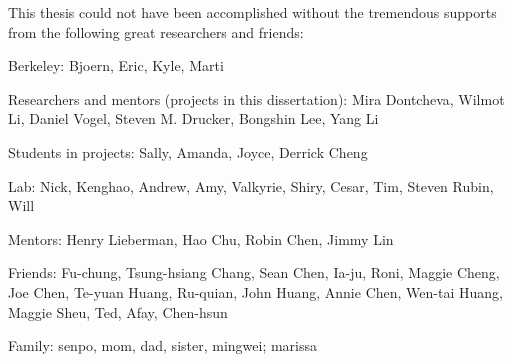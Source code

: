 \begin{acknowledgements}

This thesis could not have been accomplished without the tremendous supports from the following great researchers and friends:

Berkeley: Bjoern, Eric, Kyle, Marti

Researchers and mentors (projects in this dissertation): Mira Dontcheva, Wilmot Li, Daniel Vogel, Steven M. Drucker, Bongshin Lee, Yang Li

Students in projects: Sally, Amanda, Joyce, Derrick Cheng

Lab: Nick, Kenghao, Andrew, Amy, Valkyrie, Shiry, Cesar, Tim, Steven Rubin, Will

Mentors: Henry Lieberman, Hao Chu, Robin Chen, Jimmy Lin

Friends: Fu-chung, Tsung-hsiang Chang, Sean Chen, Ia-ju, Roni, Maggie Cheng, Joe Chen, Te-yuan Huang, Ru-quian, John Huang, Annie Chen, Wen-tai Huang, Maggie Sheu, Ted, Afay, Chen-hsun

Family: senpo, mom, dad, sister, mingwei; marissa




\end{acknowledgements}
